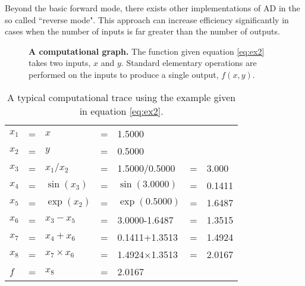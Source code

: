 Beyond the basic forward mode, there exists other implementations of AD in the so called ``reverse mode". This approach can increase efficiency significantly in cases when the number of inputs is far greater than the number of outputs. 
\begin{figure}[H]
    \centering
    \caption{\textbf{A computational graph.} The function given equation \eqref{eq:ex2} takes two inputs, $x$ and $y$. Standard elementary operations are performed on the inputs to produce a single output, $f(x,y)$.}
    \label{fig:cg-ex2}
\end{figure}
\begin{table}[H]
    \centering
    \begin{tabular}{lclclcl}
         $x_1$&=&$x$&=&1.5000&&\\
         $x_2$&=&$y$&=&0.5000&&\\
         \hline\hline
         $x_3$&=&$x_1/x_2$&=&1.5000/0.5000&=&3.000\\
         $x_4$&=&$\sin(x_3)$&=&$\sin(3.0000)$&=&0.1411\\
         $x_5$&=&$\exp(x_2)$&=&$\exp(0.5000)$&=&1.6487\\
         $x_6$&=&$x_3-x_5$&=&3.0000-1.6487&=&1.3515\\
         $x_7$&=&$x_4+x_6$&=&0.1411+1.3513&=&1.4924\\
         $x_8$&=&$x_7\times x_6$&=&1.4924$\times$1.3513&=&2.0167\\
         \hline\hline
         $f$&=&$x_8$&=&2.0167&&
    \end{tabular}
    \caption{A typical computational trace using the example given in equation \eqref{eq:ex2}.}
    \label{tab:trace-ex}
\end{table}
